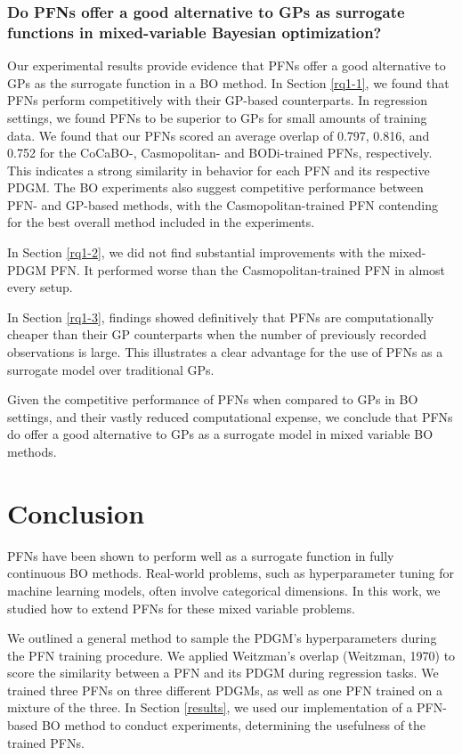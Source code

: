 \documentclass[12pt,twoside]{reedthesis}
\begin{document}
\hypertarget{rq1}{%
\subsection{Do PFNs offer a good alternative to GPs as surrogate functions in mixed-variable Bayesian optimization?}\label{rq1}}

Our experimental results provide evidence that PFNs offer a good alternative to GPs as the surrogate function in a BO method. In Section \ref{rq1-1}, we found that PFNs perform competitively with their GP-based counterparts. In regression settings, we found PFNs to be superior to GPs for small amounts of training data. We found that our PFNs scored an average overlap of 0.797, 0.816, and 0.752 for the CoCaBO-, Casmopolitan- and BODi-trained PFNs, respectively. This indicates a strong similarity in behavior for each PFN and its respective PDGM. The BO experiments also suggest competitive performance between PFN- and GP-based methods, with the Casmopolitan-trained PFN contending for the best overall method included in the experiments.

In Section \ref{rq1-2}, we did not find substantial improvements with the mixed-PDGM PFN. It performed worse than the Casmopolitan-trained PFN in almost every setup.

In Section \ref{rq1-3}, findings showed definitively that PFNs are computationally cheaper than their GP counterparts when the number of previously recorded observations is large. This illustrates a clear advantage for the use of PFNs as a surrogate model over traditional GPs.

Given the competitive performance of PFNs when compared to GPs in BO settings, and their vastly reduced computational expense, we conclude that PFNs do offer a good alternative to GPs as a surrogate model in mixed variable BO methods.

\hypertarget{discussion}{%
\chapter{Conclusion}\label{discussion}}

PFNs have been shown to perform well as a surrogate function in fully continuous BO methods. Real-world problems, such as hyperparameter tuning for machine learning models, often involve categorical dimensions. In this work, we studied how to extend PFNs for these mixed variable problems.

We outlined a general method to sample the PDGM's hyperparameters during the PFN training procedure. We applied Weitzman's overlap (Weitzman, 1970) to score the similarity between a PFN and its PDGM during regression tasks. We trained three PFNs on three different PDGMs, as well as one PFN trained on a mixture of the three. In Section \ref{results}, we used our implementation of a PFN-based BO method to conduct experiments, determining the usefulness of the trained PFNs.
\end{document}
